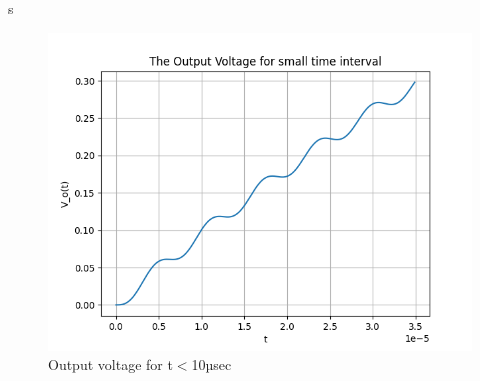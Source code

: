 s\documentclass{article}
\begin{document}
 \begin{figure}[!ht]
  \centering
  \includegraphics[scale=0.7]{Figure_7.png}
  \caption{Output voltage for t$<$10µsec}
  \label{fig:sample}
  \end{figure}
  
  
\end{document}
